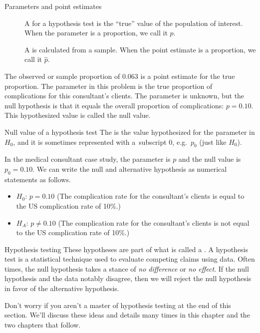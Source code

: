 \begin{onebox}{Parameters and point estimates}
\vspace{-5mm}
\begin{description}
\item[] A  for a hypothesis test is the ``true'' value of the population of interest. When the parameter is a proportion, we call it $p$.
\item[] A  is calculated from a sample. When the point estimate is a proportion, we call it $\hat{p}$.
\end{description}
\end{onebox}

The observed or sample proportion of 0.063 is a point estimate for the true proportion. The parameter in this problem is the true proportion of complications for this consultant's clients. The parameter is unknown, but the null hypothesis is that it equals the overall proportion of complications: $p = 0.10$. This hypothesized value is called the null value.

\begin{onebox}{Null value of a hypothesis test}
The  is the value hypothesized for the parameter in $H_0$, and it is sometimes represented with a~subscript 0, e.g.~$p_0$ (just like $H_0$).\end{onebox}

In the medical consultant case study, the parameter is $p$ and the null value is $p_0 = 0.10$. We can write the null and alternative hypothesis as numerical statements as follows.
\begin{itemize}
\item $H_0$: $p=0.10$ (The complication rate for the consultant's clients is equal to the US complication rate of 10\%.)
\item $H_A$: $p \neq 0.10$ (The complication rate for the consultant's clients is not equal to the US complication rate of 10\%.)
\end{itemize}

\begin{onebox}{Hypothesis testing}
These hypotheses are part of what is called a . A hypothesis test is a statistical technique used to evaluate competing claims using data. Often times, the null hypothesis takes a stance of \emph{no difference} or \emph{no effect}. If the null hypothesis and the data notably disagree, then we will reject the null hypothesis in favor of the alternative hypothesis.\vspace{3mm}

Don't worry if you aren't a master of hypothesis testing at the end of this section. We'll discuss these ideas and details many times in this chapter and the two chapters that follow.\end{onebox}

